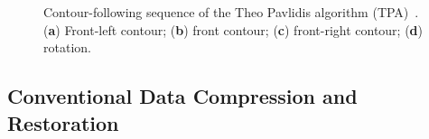 \documentclass[sensors,article,accept,moreauthors,pdftex,10pt,a4paper]{mdpi}
\begin{document}
\begin{figure}[H]
	\centering
	 
	\caption{Contour-following sequence of the Theo Pavlidis algorithm (TPA)~\cite{Cheong2006Advanced}. (\textbf{a}) Front-left contour; (\textbf{b}) front contour; (\textbf{c}) front-right contour; (\textbf{d}) rotation.}
	\label{fig:image6}
\end{figure}

\subsection{Conventional Data Compression and Restoration}
\end{document}

